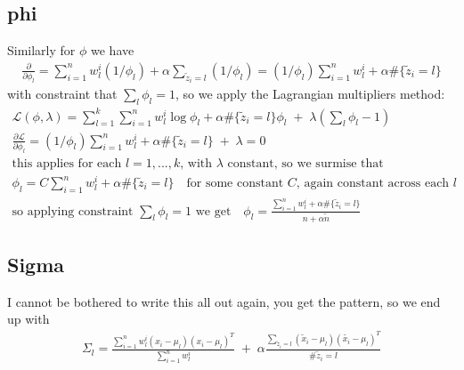 \begin{answer}
\subsection*{phi}
Similarly for $\phi$ we have
\begin{align*}
\frac{\partial}{\partial \phi_l} = \sum_{i=1}^n w^i_l (1/\phi_l) + \alpha \sum_{\tilde{z}_i = l} (1/\phi_l) = (1/\phi_l) \sum_{i=1}^n w^i_l + \alpha \#\{\tilde{z}_i = l\}
\end{align*}
with constraint that $\sum_l \phi_l = 1$, so we apply the Lagrangian multipliers method:
\begin{align*}
\mathcal{L}(\phi, \lambda) = \sum_{l=1}^k \sum_{i=1}^n w^i_l \log \phi_l + \alpha \#\{\tilde{z}_i = l\} \phi_l \;+\; \lambda( \sum_l \phi_l - 1)
\\
\frac{\partial \mathcal{L}}{\partial \phi_l} = (1/\phi_l) \sum_{i=1}^n w^i_l + \alpha \#\{\tilde{z}_i = l\} \;+\; \lambda = 0
\\
\text{this applies for each $l=1,...,k$, with $\lambda$ constant, so we surmise that}
\\
\phi_l = C \sum_{i=1}^n w^i_l + \alpha \#\{\tilde{z}_i = l\} \quad \text{for some constant $C$, again constant across each $l$}
\\
\text{so applying constraint $\sum_l \phi_l = 1$ we get} \quad
\phi_l = \frac{\sum_{i=1}^n w^i_l + \alpha \#\{\tilde{z}_i = l\}}
{n + \alpha \tilde{n}}
\end{align*}


\subsection*{Sigma}
I cannot be bothered to write this all out again, you get the pattern, so we end up with 
\begin{align*}
\Sigma_l = \frac{\sum_{i=1}^n w^i_l (x_i - \mu_l)(x_i - \mu_l)^T}
{\sum_{i=1}^n w^i_l}
 \;+\;
 \alpha  \frac{\sum_{\tilde{z}_i = l} (\tilde{x}_i - \mu_l)(\tilde{x_i} -  \mu_l)^T}
 {\#{\tilde{z}_i = l}}
\end{align*}
\end{answer}
